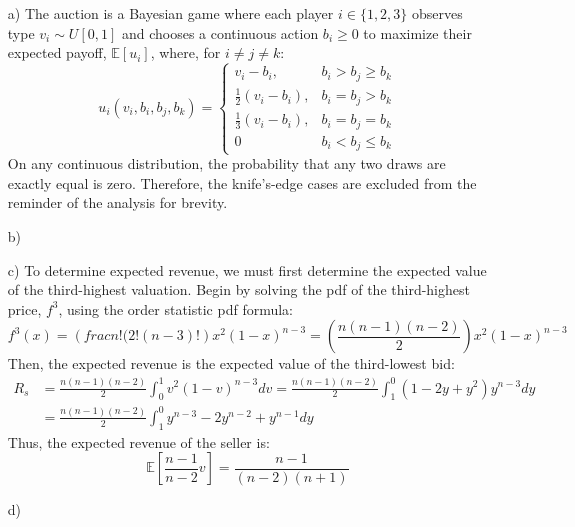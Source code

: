 \documentclass{article}
\newcommand{\E}[1]{\mathbb{E}\left[#1\right]} %
\begin{document}
\begin{itemize}
	\item[a)] The auction is a Bayesian game where each player ${i\in\{1,2,3\}}$ observes type ${v_i\sim U[0,1]}$ and chooses a continuous action ${b_i\geq 0}$ to maximize their expected payoff, $\E{u_i}$, where, for ${i\neq j \neq k}$:
		\[
			u_i(v_i,b_i,b_j,b_k) =	\begin{cases}
										v_i - b_i, 				&b_i>b_j\geq b_k 					\\
										\frac{1}{2}(v_i-b_i), 	&b_i=b_j>b_k						\\
										\frac{1}{3}(v_i-b_i),	&b_i=b_j=b_k						\\
										0						&b_i < b_j\leq b_k
									\end{cases}
		\]
		On any continuous distribution, the probability that any two draws are exactly equal is zero. Therefore, the knife's-edge cases are excluded from the reminder of the analysis for brevity.

	
	\item[b)] 


	\item[c)] To determine expected revenue, we must first determine the expected value of the third-highest valuation. Begin by solving the pdf of the third-highest price, $f^3$, using the order statistic pdf formula:
		\[
			f^3(x) = \left(frac{n!}{(2!(n-3)!}\right)x^2(1-x)^{n-3} = \left(\frac{n(n-1)(n-2)}{2}\right)x^2(1-x)^{n-3}
		\]
		Then, the expected revenue is the expected value of the third-lowest bid:
		\begin{align*}
			R_s	&= \frac{n(n-1)(n-2)}{2}\int_0^1v^2(1-v)^{n-3}dv = 	\frac{n(n-1)(n-2)}{2}\int_1^0(1-2y+y^2)y^{n-3}dy					\\
				&= \frac{n(n-1)(n-2)}{2}\int_1^0y^{n-3}-2y^{n-2}+y^{n-1}dy
		\end{align*}
		Thus, the expected revenue of the seller is:
		\[
			\E{\frac{n-1}{n-2}v} = \frac{n-1}{(n-2)(n+1)}
		\]

	\item[d)] 


\end{itemize}


\end{document}
